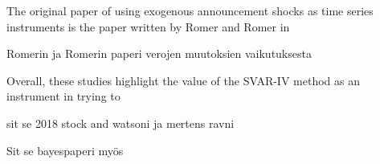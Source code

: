 \documentclass[
]{article}
\begin{document}
The original paper of using exogenous announcement shocks as time series instruments is the paper written by Romer and Romer in

Romerin ja Romerin paperi verojen muutoksien vaikutuksesta

Overall, these studies highlight the value of the SVAR-IV method as an instrument in trying to

sit se 2018 stock and watsoni ja mertens ravni

Sit se bayespaperi myös
\end{document}

